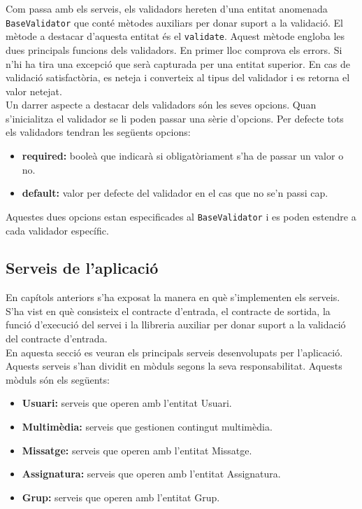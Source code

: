 	 Com passa amb els serveis, els validadors hereten d'una entitat anomenada \texttt{BaseValidator} que conté mètodes auxiliars per donar suport a la validació. El mètode a destacar d'aquesta entitat és el \texttt{validate}. Aquest mètode engloba les dues principals funcions dels validadors. En primer lloc comprova els errors. Si n'hi ha tira una excepció que serà capturada per una entitat superior. En cas de validació satisfactòria, es neteja i converteix al tipus del validador i es retorna el valor netejat.\\
	 
	 Un darrer aspecte a destacar dels validadors són les seves opcions. Quan s'inicialitza el validador se li poden passar una sèrie d'opcions. Per defecte tots els validadors tendran les següents opcions:
	 
	 \begin{itemize}
	 	\item \textbf{required:} booleà que indicarà si obligatòriament s'ha de passar un valor o no.
	 	\item \textbf{default:} valor per defecte del validador en el cas que no se'n passi cap.
	 \end{itemize}
	 
	 Aquestes dues opcions estan especificades al \texttt{BaseValidator} i es poden estendre a cada validador específic.
	 
	\subsection{Serveis de l'aplicació} \label{serveis_aplicacio}
	
		En capítols anteriors s'ha exposat la manera en què s'implementen els serveis. S'ha vist en què consisteix el contracte d'entrada, el contracte de sortida, la funció d'execució del servei i la llibreria auxiliar per donar suport a la validació del contracte d'entrada.\\
		
		En aquesta secció es veuran els principals serveis desenvolupats per l'aplicació. Aquests serveis s'han dividit en mòduls segons la seva responsabilitat. Aquests mòduls són els següents:
		
		\begin{itemize}
			\item \textbf{Usuari:} serveis que operen amb l'entitat Usuari.
			\item \textbf{Multimèdia:} serveis que gestionen contingut multimèdia.
			\item \textbf{Missatge:} serveis que operen amb l'entitat Missatge.
			\item \textbf{Assignatura:} serveis que operen amb l'entitat Assignatura.
			\item \textbf{Grup:} serveis que operen amb l'entitat Grup.
		\end{itemize}
		
